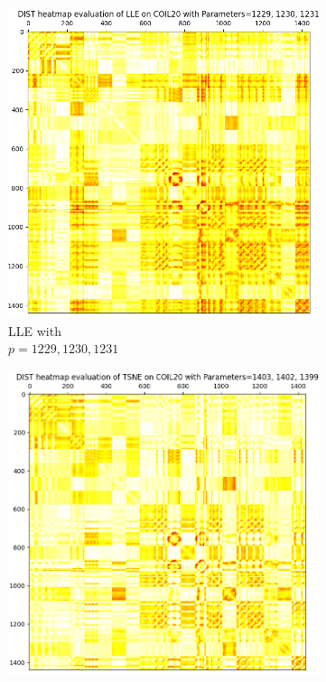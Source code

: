 \begin{figure}[!]
\begin{subfigure}[t]{0.32\columnwidth}
    	\includegraphics[width=\columnwidth]{images/dist_heatmap_lle_coil20_1-3best.png}
    	\caption{LLE with \\ $p=1229,1230,1231$}
        \label{fig:dist_heatmap_lle_coil20_1-3best}
    \end{subfigure}
     \hfill
     \begin{subfigure}[t]{0.32\columnwidth}
    	\centering
    	\includegraphics[width=\columnwidth]{images/dist_heatmap_tsne_coil20_1-3best.png}

\end{subfigure}
\end{figure}
